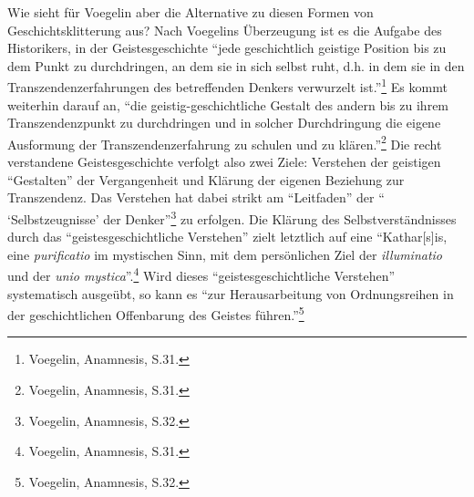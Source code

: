 Wie sieht für Voegelin aber die Alternative zu diesen Formen von
Geschichtsklitterung aus? Nach Voegelins Überzeugung ist es die Aufgabe des
Historikers, in der Geistesgeschichte "`jede geschichtlich geistige Position
bis zu dem Punkt zu durchdringen, an dem sie in sich selbst ruht, d.h. in dem
sie in den Transzendenzerfahrungen des betreffenden Denkers verwurzelt
ist."'\footnote{Voegelin, Anamnesis, S.31.} Es kommt weiterhin darauf an,
"`die geistig-geschichtliche Gestalt des andern bis zu ihrem Transzendenzpunkt
zu durchdringen und in solcher Durchdringung die eigene Ausformung der
Transzendenzerfahrung zu schulen und zu klären."'\footnote{Voegelin,
  Anamnesis, S.31.} Die recht verstandene Geistesgeschichte verfolgt also zwei
Ziele: Verstehen der geistigen "`Gestalten"' der Vergangenheit und Klärung der
eigenen Beziehung zur Transzendenz. Das Verstehen hat dabei strikt am
"`Leitfaden"' der "` `Selbstzeugnisse' der Denker"'\footnote{Voegelin,
  Anamnesis, S.32.} zu erfolgen. Die Klärung des Selbstverständnisses durch
das "`geistesgeschichtliche Verstehen"' zielt letztlich auf eine
"`Kathar[s]is, eine {\it purificatio} im mystischen Sinn, mit dem persönlichen
Ziel der {\it illuminatio} und der {\it unio mystica}"'.\footnote{Voegelin,
  Anamnesis, S.31.}  Wird dieses "`geistesgeschichtliche Verstehen"'
systematisch ausgeübt, so kann es "`zur Herausarbeitung von Ordnungsreihen in
der geschichtlichen Offenbarung des Geistes führen."'\footnote{Voegelin,
  Anamnesis, S.32.}


